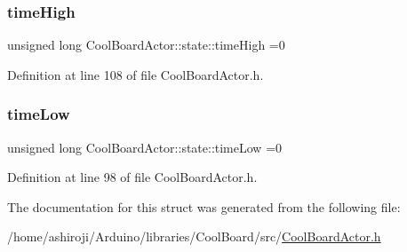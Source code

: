 \subsubsection{\texorpdfstring{time\+High}{timeHigh}}
{\footnotesize\ttfamily unsigned long Cool\+Board\+Actor\+::state\+::time\+High =0}



Definition at line 108 of file Cool\+Board\+Actor.\+h.

\mbox{\label{struct_cool_board_actor_1_1state_a314c53c146e8c7b12c025323a34fbb9a}} 
\subsubsection{\texorpdfstring{time\+Low}{timeLow}}
{\footnotesize\ttfamily unsigned long Cool\+Board\+Actor\+::state\+::time\+Low =0}



Definition at line 98 of file Cool\+Board\+Actor.\+h.



The documentation for this struct was generated from the following file\+:\begin{DoxyCompactItemize}
\item 
/home/ashiroji/\+Arduino/libraries/\+Cool\+Board/src/\hyperlink{_cool_board_actor_8h}{Cool\+Board\+Actor.\+h}\end{DoxyCompactItemize}
